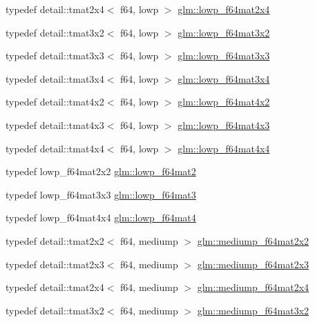 \begin{DoxyCompactItemize}
\item 
typedef detail\+::tmat2x4$<$ f64, lowp $>$ \hyperlink{group__gtc__type__precision_ga38366c50f2a2755c49110c7fc1441683}{glm\+::lowp\+\_\+f64mat2x4}
\item 
typedef detail\+::tmat3x2$<$ f64, lowp $>$ \hyperlink{group__gtc__type__precision_ga99f6455a37a4c407a26981561184c76d}{glm\+::lowp\+\_\+f64mat3x2}
\item 
typedef detail\+::tmat3x3$<$ f64, lowp $>$ \hyperlink{group__gtc__type__precision_ga3b636bef3048da2f7935eae13e66f7b3}{glm\+::lowp\+\_\+f64mat3x3}
\item 
typedef detail\+::tmat3x4$<$ f64, lowp $>$ \hyperlink{group__gtc__type__precision_ga988c6645dead17a842c47ec042b5369e}{glm\+::lowp\+\_\+f64mat3x4}
\item 
typedef detail\+::tmat4x2$<$ f64, lowp $>$ \hyperlink{group__gtc__type__precision_ga37d10de43251a9a1be734bbb340ad2e7}{glm\+::lowp\+\_\+f64mat4x2}
\item 
typedef detail\+::tmat4x3$<$ f64, lowp $>$ \hyperlink{group__gtc__type__precision_ga05dba0f9d45301c7b10a9276c60b8a0e}{glm\+::lowp\+\_\+f64mat4x3}
\item 
typedef detail\+::tmat4x4$<$ f64, lowp $>$ \hyperlink{group__gtc__type__precision_gab7d0922ed8d93ee3ce995858feb41231}{glm\+::lowp\+\_\+f64mat4x4}
\item 
typedef lowp\+\_\+f64mat2x2 \hyperlink{group__gtc__type__precision_ga2984b3b0b6ee0657044d186bb875b4e3}{glm\+::lowp\+\_\+f64mat2}
\item 
typedef lowp\+\_\+f64mat3x3 \hyperlink{group__gtc__type__precision_ga4acbda53fb7ff9568c0a2786fad450b8}{glm\+::lowp\+\_\+f64mat3}
\item 
typedef lowp\+\_\+f64mat4x4 \hyperlink{group__gtc__type__precision_ga4378d9384f1b24848043ccb02dcf2959}{glm\+::lowp\+\_\+f64mat4}
\item 
typedef detail\+::tmat2x2$<$ f64, mediump $>$ \hyperlink{group__gtc__type__precision_gacfa9f872c78d9e8b8e6c5dd0088db8fc}{glm\+::mediump\+\_\+f64mat2x2}
\item 
typedef detail\+::tmat2x3$<$ f64, mediump $>$ \hyperlink{group__gtc__type__precision_ga6f463cb5e9b4e5c07a385843ed50e6b8}{glm\+::mediump\+\_\+f64mat2x3}
\item 
typedef detail\+::tmat2x4$<$ f64, mediump $>$ \hyperlink{group__gtc__type__precision_ga65c67789f7e2ff605d8f48dc3750a515}{glm\+::mediump\+\_\+f64mat2x4}
\item 
typedef detail\+::tmat3x2$<$ f64, mediump $>$ \hyperlink{group__gtc__type__precision_gad6408472435fce994a3bb9d14d321ddd}{glm\+::mediump\+\_\+f64mat3x2}

\end{DoxyCompactItemize}
